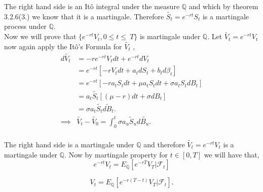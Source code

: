 \documentclass[12pt]{report}
\begin{document}
The right hand side is an Itô integral under the measure
$\mathbb{Q}$ and which by theorem 3.2.6(3.) we know that it is a martingale. Therefore $\widetilde{S_t} = e^{-rt}S_{t}$ is a martingale process under $\mathbb{Q}$.\\
Now we will prove that $\{e^{-rt}V_t ,0 \leq t \leq\ T\}$ is martingale under $\mathbb{Q}$. Let $\widetilde{V_t} = e^{-rt}V_{t}$ now again apply the Itô's Formula for $\widetilde{V_t}$ ,\\
\begin{align*}
   d\widetilde{V_t} & = -re^{-rt}V_tdt + e^{-rt}dV_{t}\\
                    & =e^{-rt}[-r V_t dt + a_t dS_t + b_t d\beta_t]\\
                    & =e^{-rt}[-r a_t S_t dt + \mu a_t S_t dt + \sigma a_t S_t dB_t]\\
                    & =a_t \widetilde{S_t} [(\mu - r) dt + \sigma dB_t]\\
                    & = \sigma a_t \widetilde{S_t} \widetilde{dB_t}.\\
                    \implies & \widetilde{V_t} - \widetilde{V_0} = \int_{0}^{t}\sigma a_u \widetilde{S}_ud\widetilde{B_u}. \\
\end{align*}

The right hand side is a martingale under $\mathbb{Q}$ and therefore $\widetilde{V_t} = e^{-rt}V_t$ is a martingale under $\mathbb{Q}$. Now by martingale property for $t \in [0,T]$ we will have that,
\begin{equation}
e^{-rt} V_{t} = E_{\mathbb{Q}}[e^{-rT}V_{T}|\mathcal{F}_{t}] 
\end{equation}

\begin{equation}
    V_{t} = E_{\mathbb{Q}}[e^{-r(T-t)}V_{T}|\mathcal{F}_{t}].
\end{equation}
\end{document}
